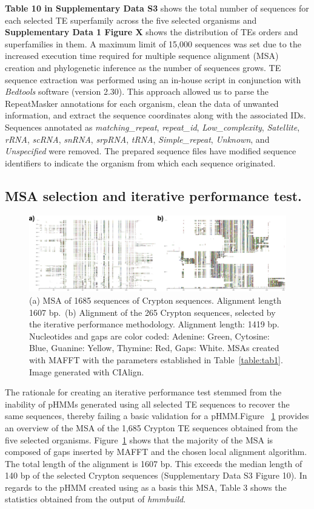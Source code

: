 \documentclass[unnumsec,webpdf,contemporary,large]{oup-authoring-template}%
\theoremstyle{thmstyleone}%
\theoremstyle{thmstyletwo}%
\theoremstyle{thmstylethree}%
\begin{document}
\textbf{Table 10 in Supplementary Data S3} shows the total number of sequences
for each selected TE superfamily across the five selected organisms and
\textbf{Supplementary Data 1 Figure X} shows the distribution of TEs orders and
superfamilies in them. A maximum limit of 15,000 sequences was set due to the
increased execution time required for multiple sequence alignment (MSA) creation
and phylogenetic inference as the number of sequences grows. TE sequence
extraction was performed using an in-house script in conjunction with
\textit{Bedtools} software (version 2.30). This approach allowed us to parse the
RepeatMasker annotations for each organism, clean the data of unwanted
information, and extract the sequence coordinates along with the associated IDs.
Sequences annotated as \textit{matching\_repeat}, \textit{repeat\_id},
\textit{Low\_complexity}, \textit{Satellite}, \textit{rRNA}, \textit{scRNA},
\textit{snRNA}, \textit{srpRNA}, \textit{tRNA}, \textit{Simple\_repeat},
\textit{Unknown}, and \textit{Unspecified} were removed. The prepared sequence
files have modified sequence identifiers to indicate the organism from which
each sequence originated.

\subsection{MSA selection and iterative performance test.}\label{subsec3_2}

\begin{figure}[!t]
\centering
\includegraphics[width=\textwidth]{figs/msas_crypton.eps}
\caption{(a) MSA of 1685 sequences of Crypton sequences. Alignment length
1607 bp.\ (b) Alignment of the 265 Crypton sequences, selected by the
iterative performance methodology. Alignment length: 1419 bp. Nucleotides
and gaps are color coded: Adenine: Green, Cytosine: Blue, Guanine: Yellow,
Thymine: Red, Gaps: White. MSAs created with MAFFT with the parameters
established in Table~\ref{table:tab1}. Image generated with
CIAlign.}\label{fig:image2}
\end{figure}

The rationale for creating an iterative performance test stemmed from the
inability of pHMMs generated using all selected TE sequences to recover the same
sequences, thereby failing a basic validation for a pHMM.\@ Figure
~\ref{fig:image2} provides an overview of the MSA of the 1,685 Crypton TE
sequences obtained from the five selected organisms. Figure~\ref{fig:image2}
shows that the majority of the MSA is composed of gaps inserted by MAFFT and the
chosen local alignment algorithm. The total length of the alignment is 1607 bp.
This exceeds the median length of 140 bp of the selected Crypton sequences
(Supplementary Data S3 Figure 10). In regards to the pHMM created using as a
basis this MSA, Table 3 shows the statistics obtained from the output of
\textit{hmmbuild}. 
\end{document}
